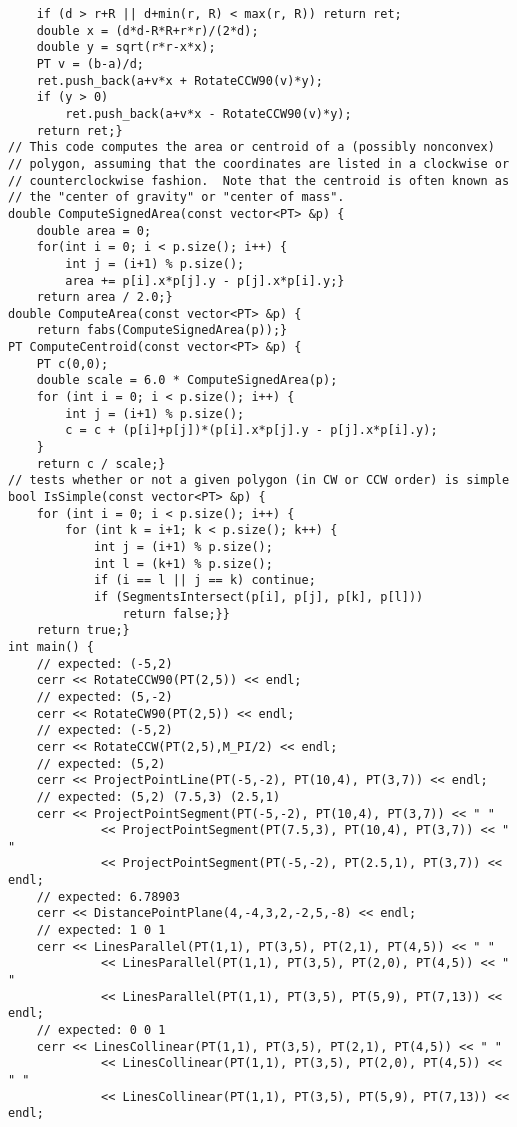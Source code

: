 \documentclass[8pt, oneside]{extarticle}
\begin{document}
\begin{multicols}{3}
\begin{lstlisting}
    if (d > r+R || d+min(r, R) < max(r, R)) return ret;
    double x = (d*d-R*R+r*r)/(2*d);
    double y = sqrt(r*r-x*x);
    PT v = (b-a)/d;
    ret.push_back(a+v*x + RotateCCW90(v)*y);
    if (y > 0)
        ret.push_back(a+v*x - RotateCCW90(v)*y);
    return ret;}
// This code computes the area or centroid of a (possibly nonconvex)
// polygon, assuming that the coordinates are listed in a clockwise or
// counterclockwise fashion.  Note that the centroid is often known as
// the "center of gravity" or "center of mass".
double ComputeSignedArea(const vector<PT> &p) {
    double area = 0;
    for(int i = 0; i < p.size(); i++) {
        int j = (i+1) % p.size();
        area += p[i].x*p[j].y - p[j].x*p[i].y;}
    return area / 2.0;}
double ComputeArea(const vector<PT> &p) {
    return fabs(ComputeSignedArea(p));}
PT ComputeCentroid(const vector<PT> &p) {
    PT c(0,0);
    double scale = 6.0 * ComputeSignedArea(p);
    for (int i = 0; i < p.size(); i++) {
        int j = (i+1) % p.size();
        c = c + (p[i]+p[j])*(p[i].x*p[j].y - p[j].x*p[i].y);
    }
    return c / scale;}
// tests whether or not a given polygon (in CW or CCW order) is simple
bool IsSimple(const vector<PT> &p) {
    for (int i = 0; i < p.size(); i++) {
        for (int k = i+1; k < p.size(); k++) {
            int j = (i+1) % p.size();
            int l = (k+1) % p.size();
            if (i == l || j == k) continue;
            if (SegmentsIntersect(p[i], p[j], p[k], p[l])) 
                return false;}}
    return true;}
int main() {
    // expected: (-5,2)
    cerr << RotateCCW90(PT(2,5)) << endl;
    // expected: (5,-2)
    cerr << RotateCW90(PT(2,5)) << endl;
    // expected: (-5,2)
    cerr << RotateCCW(PT(2,5),M_PI/2) << endl;
    // expected: (5,2)
    cerr << ProjectPointLine(PT(-5,-2), PT(10,4), PT(3,7)) << endl;
    // expected: (5,2) (7.5,3) (2.5,1)
    cerr << ProjectPointSegment(PT(-5,-2), PT(10,4), PT(3,7)) << " "
             << ProjectPointSegment(PT(7.5,3), PT(10,4), PT(3,7)) << " "
             << ProjectPointSegment(PT(-5,-2), PT(2.5,1), PT(3,7)) << endl;
    // expected: 6.78903
    cerr << DistancePointPlane(4,-4,3,2,-2,5,-8) << endl;
    // expected: 1 0 1
    cerr << LinesParallel(PT(1,1), PT(3,5), PT(2,1), PT(4,5)) << " "
             << LinesParallel(PT(1,1), PT(3,5), PT(2,0), PT(4,5)) << " "
             << LinesParallel(PT(1,1), PT(3,5), PT(5,9), PT(7,13)) << endl;
    // expected: 0 0 1
    cerr << LinesCollinear(PT(1,1), PT(3,5), PT(2,1), PT(4,5)) << " "
             << LinesCollinear(PT(1,1), PT(3,5), PT(2,0), PT(4,5)) << " "
             << LinesCollinear(PT(1,1), PT(3,5), PT(5,9), PT(7,13)) << endl;

\end{lstlisting}
\end{multicols}
\end{document}
